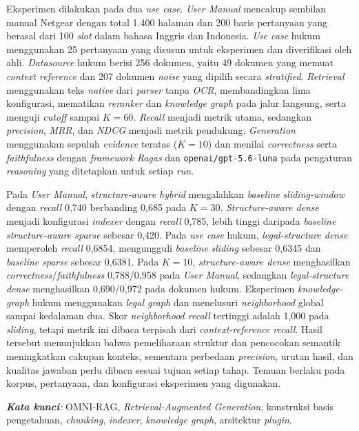 \begin{singlespace}
    Eksperimen dilakukan pada dua \emph{use case}. \emph{User Manual} mencakup sembilan manual Netgear dengan total 1.400 halaman dan 200 baris pertanyaan yang berasal dari 100 \emph{slot} dalam bahasa Inggris dan Indonesia. \emph{Use case} hukum menggunakan 25 pertanyaan yang disusun untuk eksperimen dan diverifikasi oleh ahli. \emph{Datasource} hukum berisi 256 dokumen, yaitu 49 dokumen yang memuat \emph{context reference} dan 207 dokumen \emph{noise} yang dipilih secara \emph{stratified}. \emph{Retrieval} menggunakan teks \emph{native} dari \emph{parser} tanpa \emph{OCR}, membandingkan lima konfigurasi, mematikan \emph{reranker} dan \emph{knowledge graph} pada jalur langsung, serta menguji \emph{cutoff} sampai \(K = 60\). \emph{Recall} menjadi metrik utama, sedangkan \emph{precision}, \emph{MRR}, dan \emph{NDCG} menjadi metrik pendukung. \emph{Generation} menggunakan sepuluh \emph{evidence} teratas (\(K = 10\)) dan menilai \emph{correctness} serta \emph{faithfulness} dengan \emph{framework} \emph{Ragas} dan \texttt{openai/gpt-5.6-luna} pada pengaturan \emph{reasoning} yang ditetapkan untuk setiap \emph{run}.

    Pada \emph{User Manual}, \emph{structure-aware hybrid} mengalahkan \emph{baseline} \emph{sliding-window} dengan \emph{recall} 0,740 berbanding 0,685 pada \(K = 30\). \emph{Structure-aware dense} menjadi konfigurasi \emph{indexer} dengan \emph{recall} 0,785, lebih tinggi daripada \emph{baseline} \emph{structure-aware sparse} sebesar 0,420. Pada \emph{use case} hukum, \emph{legal-structure dense} memperoleh \emph{recall} 0,6854, mengungguli \emph{baseline} \emph{sliding} sebesar 0,6345 dan \emph{baseline} \emph{sparse} sebesar 0,6381. Pada \(K = 10\), \emph{structure-aware dense} menghasilkan \emph{correctness}/\emph{faithfulness} 0,788/0,958 pada \emph{User Manual}, sedangkan \emph{legal-structure dense} menghasilkan 0,690/0,972 pada dokumen hukum. Eksperimen \emph{knowledge-graph} hukum menggunakan \emph{legal graph} dan menelusuri \emph{neighborhood} global sampai kedalaman dua. Skor \emph{neighborhood recall} tertinggi adalah 1,000 pada \emph{sliding}, tetapi metrik ini dibaca terpisah dari \emph{context-reference recall}. Hasil tersebut menunjukkan bahwa pemeliharaan struktur dan pencocokan semantik meningkatkan cakupan konteks, sementara perbedaan \emph{precision}, urutan hasil, dan kualitas jawaban perlu dibaca sesuai tujuan setiap tahap. Temuan berlaku pada korpus, pertanyaan, dan konfigurasi eksperimen yang digunakan.

    \textit{\textbf{Kata kunci}:} OMNI-RAG, \emph{Retrieval-Augmented Generation}, konstruksi basis pengetahuan, \emph{chunking}, \emph{indexer}, \emph{knowledge graph}, arsitektur \emph{plugin}.
\end{singlespace}

\clearpage
